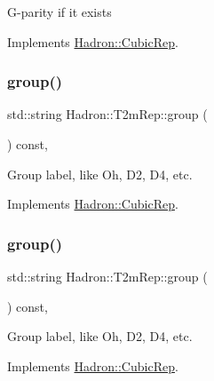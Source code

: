 G-\/parity if it exists 

Implements \mbox{\hyperlink{structHadron_1_1CubicRep_a52104e43266d1614c00bbd1c3b395458}{Hadron\+::\+Cubic\+Rep}}.

\mbox{\label{structHadron_1_1T2mRep_a2a362df9bb685dadcae8261f8a081d93}} 
\subsubsection{\texorpdfstring{group()}{group()}\hspace{0.1cm}{\footnotesize\ttfamily [1/3]}}
{\footnotesize\ttfamily std\+::string Hadron\+::\+T2m\+Rep\+::group (\begin{DoxyParamCaption}{ }\end{DoxyParamCaption}) const\hspace{0.3cm}{\ttfamily [inline]}, {\ttfamily [virtual]}}

Group label, like Oh, D2, D4, etc. 

Implements \mbox{\hyperlink{structHadron_1_1CubicRep_a0748f11ec87f387062c8e8981339a29c}{Hadron\+::\+Cubic\+Rep}}.

\mbox{\label{structHadron_1_1T2mRep_a2a362df9bb685dadcae8261f8a081d93}} 
\subsubsection{\texorpdfstring{group()}{group()}\hspace{0.1cm}{\footnotesize\ttfamily [2/3]}}
{\footnotesize\ttfamily std\+::string Hadron\+::\+T2m\+Rep\+::group (\begin{DoxyParamCaption}{ }\end{DoxyParamCaption}) const\hspace{0.3cm}{\ttfamily [inline]}, {\ttfamily [virtual]}}

Group label, like Oh, D2, D4, etc. 

Implements \mbox{\hyperlink{structHadron_1_1CubicRep_a0748f11ec87f387062c8e8981339a29c}{Hadron\+::\+Cubic\+Rep}}.

\mbox{\label{structHadron_1_1T2mRep_a2a362df9bb685dadcae8261f8a081d93}} 
